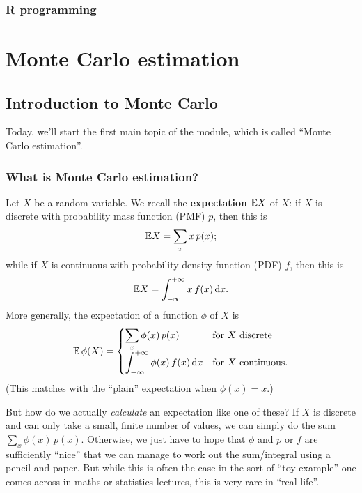 \documentclass[
  letterpaper,
  DIV=11,
  numbers=noendperiod]{scrreprt}
\theoremstyle{definition}
\theoremstyle{definition}
\theoremstyle{remark}
\begin{document}
\section{R programming}\label{r-programming}

\part{Monte Carlo estimation}

\chapter{Introduction to Monte Carlo}\label{introduction-to-monte-carlo}

Today, we'll start the first main topic of the module, which is called
``Monte Carlo estimation''.
\[\newcommand{\Exg}{\operatorname{\mathbb{E}}} \]
\[ \newcommand{\Ex}{\mathbb{E}} \]

\section{What is Monte Carlo
estimation?}\label{what-is-monte-carlo-estimation}

Let \(X\) be a random variable. We recall the \textbf{expectation}
\(\Ex X\) of \(X\): if \(X\) is discrete with probability mass function
(PMF) \(p\), then this is \[ \Ex X = \sum_x x\,p(x) ;\] while if \(X\)
is continuous with probability density function (PDF) \(f\), then this
is \[ \Ex X = \int_{-\infty}^{+\infty} x\,f(x)\,\mathrm{d}x . \] More
generally, the expectation of a function \(\phi\) of \(X\) is
\[ \Exg \phi(X) = \begin{cases} {\displaystyle \sum_x \phi(x)\,p(x)} & \text{for $X$ discrete}\\ {\displaystyle \int_{-\infty}^{+\infty} \phi(x)\,f(x)\,\mathrm{d}x}  & \text{for $X$ continuous.} \end{cases}\]
(This matches with the ``plain'' expectation when \(\phi(x) = x\).)

But how do we actually \emph{calculate} an expectation like one of
these? If \(X\) is discrete and can only take a small, finite number of
values, we can simply do the sum \(\sum_x \phi(x)\,p(x)\). Otherwise, we
just have to hope that \(\phi\) and \(p\) or \(f\) are sufficiently
``nice'' that we can manage to work out the sum/integral using a pencil
and paper. But while this is often the case in the sort of ``toy
example'' one comes across in maths or statistics lectures, this is very
rare in ``real life''.
\end{document}
